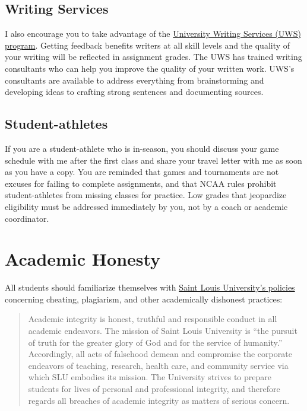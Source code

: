 \documentclass[
]{book}
\begin{document}
\hypertarget{writing-services}{%
\subsection{Writing Services}\label{writing-services}}

I also encourage you to take advantage of the \href{https://www.slu.edu/life-at-slu/student-success-center/academic-support/university-writing-services/index.php}{University Writing Services (UWS) program}. Getting feedback benefits writers at all skill levels and the quality of your writing will be reflected in assignment grades. The UWS has trained writing consultants who can help you improve the quality of your written work. UWS's consultants are available to address everything from brainstorming and developing ideas to crafting strong sentences and documenting sources.

\hypertarget{student-athletes}{%
\subsection{Student-athletes}\label{student-athletes}}

If you are a student-athlete who is in-season, you should discuss your game schedule with me after the first class and share your travel letter with me as soon as you have a copy. You are reminded that games and tournaments are not excuses for failing to complete assignments, and that NCAA rules prohibit student-athletes from missing classes for practice. Low grades that jeopardize eligibility must be addressed immediately by you, not by a coach or academic coordinator.

\hypertarget{academic-honesty}{%
\section{Academic Honesty}\label{academic-honesty}}

All students should familiarize themselves with \href{http://www.slu.edu/Documents/provost/academic_affairs/Academic\%20Integrity\%20Policy\%20FINAL\%20\%206-26-15.pd}{Saint Louis University's policies} concerning cheating, plagiarism, and other academically dishonest practices:

\begin{quote}
Academic integrity is honest, truthful and responsible conduct in all academic endeavors. The mission of Saint Louis University is ``the pursuit of truth for the greater glory of God and for the service of humanity.'' Accordingly, all acts of falsehood demean and compromise the corporate endeavors of teaching, research, health care, and community service via which SLU embodies its mission. The University strives to prepare students for lives of personal and professional integrity, and therefore regards all breaches of academic integrity as matters of serious concern.
\end{quote}
\end{document}

